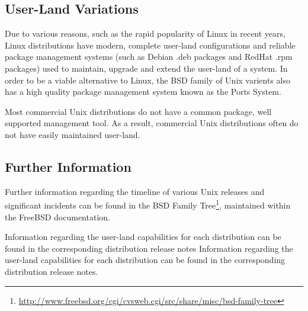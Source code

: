 \subsection{User-Land Variations}

Due to various reasons, such as the rapid popularity of Linux in recent
years, Linux distributions have modern, complete user-land
configurations and reliable package management systems (such as Debian
.deb packages and RedHat .rpm packages) used to maintain, upgrade and 
extend the user-land of a system. In order to be a viable alternative to 
Linux, the BSD family of Unix varients also has a high quality package 
management system known as the Ports System.


Most commercial Unix distributions do not have a common package, well
supported management tool. As a result, commercial Unix distributions
often do not have easily maintained user-land.

\subsection{Further Information}

Further information regarding the timeline of various Unix releases and
significant incidents can be found in the BSD Family 
Tree\footnote{\url{http://www.freebsd.org/cgi/cvsweb.cgi/src/share/misc/bsd-family-tree}}, 
maintained within the FreeBSD documentation. 


Information regarding the user-land capabilities for each distribution 
can be found in the corresponding distribution release notes Information
regarding the user-land capabilities for each distribution can be found 
in the corresponding distribution release notes.


